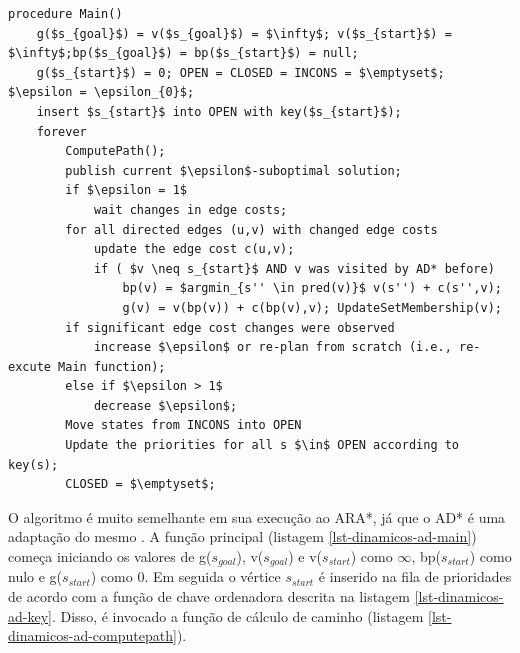 \begin{lstlisting}[mathescape, label=lst-dinamicos-ad-main, caption=Algoritmo AD* - função principal, float=htpb]
procedure Main()
	g($s_{goal}$) = v($s_{goal}$) = $\infty$; v($s_{start}$) = $\infty$;bp($s_{goal}$) = bp($s_{start}$) = null;
	g($s_{start}$) = 0; OPEN = CLOSED = INCONS = $\emptyset$; $\epsilon = \epsilon_{0}$;
	insert $s_{start}$ into OPEN with key($s_{start}$);
	forever
		ComputePath();
		publish current $\epsilon$-suboptimal solution;
		if $\epsilon = 1$
			wait changes in edge costs;
		for all directed edges (u,v) with changed edge costs
			update the edge cost c(u,v);
			if ( $v \neq s_{start}$ AND v was visited by AD* before)
				bp(v) = $argmin_{s'' \in pred(v)}$ v(s'') + c(s'',v);
				g(v) = v(bp(v)) + c(bp(v),v); UpdateSetMembership(v);
		if significant edge cost changes were observed
			increase $\epsilon$ or re-plan from scratch (i.e., re-excute Main function);
		else if $\epsilon > 1$
			decrease $\epsilon$;
		Move states from INCONS into OPEN
		Update the priorities for all s $\in$ OPEN according to key(s);
		CLOSED = $\emptyset$;
\end{lstlisting}

O algoritmo é muito semelhante em sua execução ao ARA*, já que o AD* é uma adaptação do mesmo \cite{moura2010estudo}. A função principal (listagem \ref{lst-dinamicos-ad-main}) começa iniciando os valores de g($s_{goal}$), v($s_{goal}$) e v($s_{start}$) como $\infty$, bp($s_{start}$) como nulo e g($s_{start}$) como 0. Em seguida o vértice $s_{start}$ é inserido na fila de prioridades de acordo com  a função de chave ordenadora descrita na listagem \ref{lst-dinamicos-ad-key}. Disso, é invocado a função de cálculo de caminho (listagem \ref{lst-dinamicos-ad-computepath}).

